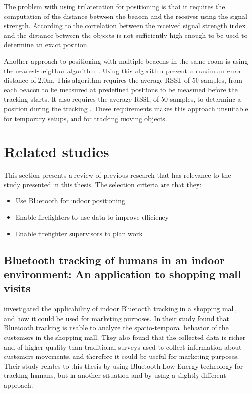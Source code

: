 \documentclass[../Main/thesis.tex]{subfiles}
\begin{document}
The problem with using trilateration for positioning is that it requires the computation of the distance between the beacon and the receiver using the signal strength.
According to \citet{Chawathe} the correlation between the received signal strength index and the distance between the objects is not sufficiently high enough to be used to determine an exact position.

Another approach to positioning with multiple beacons in the same room is using the nearest-neighbor algorithm \citep{Takahashi2016}.
Using this algorithm \citet{Takahashi2016} present a maximum error distance of 2.0m.
This algorithm requires the average RSSI, of 50 samples, from each beacon to be measured at predefined positions to be measured before the tracking starts.
It also requires the average RSSI, of 50 samples, to determine a position during the tracking \citep{Takahashi2016}.
These requirements makes this approach unsuitable for temporary setups, and for tracking moving objects.


\section{Related studies} 
This section presents a review of previous research that has relevance to the study presented in this thesis.
The selection criteria are that they:
\begin{itemize}
	\item Use Bluetooth for indoor positioning
	\item Enable firefighters to use data to improve efficiency
	\item Enable firefighter supervisors to plan work
\end{itemize}

\subsection{Bluetooth tracking of humans in an indoor environment: An application to shopping mall visits}
\label{sec:ble-tracking-mall}
\citet{Oosterlinck2017} investigated the applicability of indoor Bluetooth tracking in a shopping mall, and how it could be used for marketing purposes.
In their study \citep{Oosterlinck2017} found that Bluetooth tracking is usable to analyze the spatio-temporal behavior of the customers in the shopping mall.
They also found that the collected data is richer and of higher quality than traditional surveys used to collect information about customers movements, and therefore it could be useful for marketing purposes.
Their study relates to this thesis by using Bluetooth Low Energy technology for tracking humans, but in another situation and by using a slightly different approach.
\end{document}
